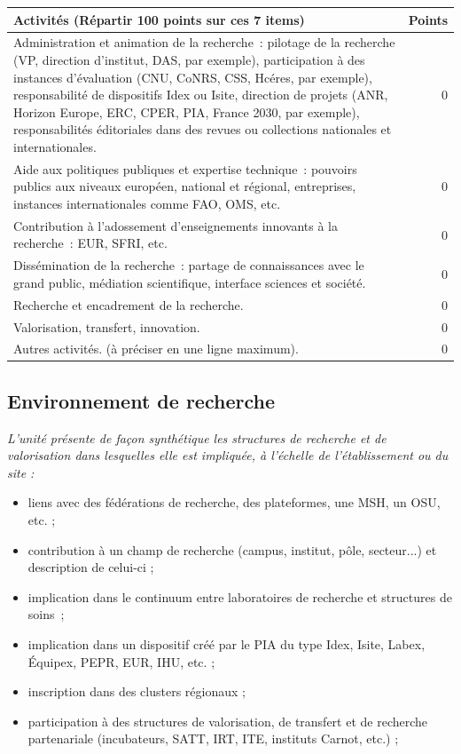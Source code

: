\documentclass[]{article}
\newcommand{\instructions}[1]{{\em \color{hceresgreen}#1}}
\begin{document}
\begin{tabular}{ |p{16cm}|r|  }
\hline
\rowcolor{gray!40}
Activités (Répartir 100 points sur ces 7 items) &  Points   \\
\hline
Administration et animation de la recherche : pilotage de la recherche (VP, direction d’institut, DAS, par exemple), participation à des instances d’évaluation (CNU, CoNRS, CSS, Hcéres, par exemple), responsabilité de dispositifs Idex ou Isite, direction de projets (ANR, Horizon Europe, ERC, CPER, PIA, France 2030, par exemple), responsabilités éditoriales dans des revues ou collections nationales et internationales. & 0 \\
\hline
Aide aux politiques publiques et expertise technique : pouvoirs publics aux niveaux européen, national et régional, entreprises, instances internationales comme FAO, OMS, etc. & 0 \\
\hline
Contribution à l’adossement d’enseignements innovants à la recherche : EUR, SFRI, etc. & 0 \\
Dissémination de la recherche : partage de connaissances avec le grand public, médiation scientifique, interface sciences et société. & 0 \\
\hline
Recherche et encadrement de la recherche. & 0 \\
\hline
Valorisation, transfert, innovation. & 0 \\
\hline
Autres activités. (à préciser en une ligne maximum). & 0 \\
\hline
\end{tabular}

\subsection{Environnement de recherche}

\instructions{L’unité présente de façon synthétique les structures de recherche et de valorisation dans lesquelles elle est impliquée, à l’échelle de l’établissement ou du site :
\begin{itemize}
\item liens avec des fédérations de recherche, des plateformes, une MSH, un OSU, etc. ;
\item contribution à un champ de recherche (campus, institut, pôle, secteur...) et description de celui-ci ;
\item implication dans le continuum entre laboratoires de recherche et structures de soins ; 
\item implication dans un dispositif créé par le PIA du type Idex, Isite, Labex, Équipex, PEPR, EUR, IHU, etc. ;
\item inscription dans des clusters régionaux ;
\item participation à des structures de valorisation, de transfert et de recherche partenariale (incubateurs, SATT, IRT, ITE, instituts Carnot, etc.) ;
\end{itemize}
}
\end{document}
